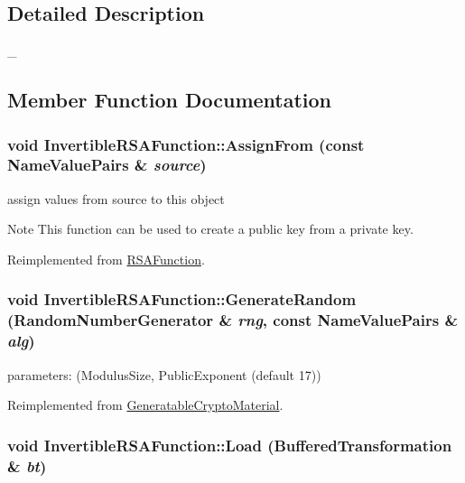 \subsection{Detailed Description}
\_\- 

\subsection{Member Function Documentation}
\hypertarget{class_invertible_r_s_a_function_a871fc366191e9c5fae114c06a200c928}{
\subsubsection[{AssignFrom}]{\setlength{\rightskip}{0pt plus 5cm}void InvertibleRSAFunction::AssignFrom (const {\bf NameValuePairs} \& {\em source})}}
\label{class_invertible_r_s_a_function_a871fc366191e9c5fae114c06a200c928}


assign values from source to this object \begin{DoxyNote}{Note}
This function can be used to create a public key from a private key. 
\end{DoxyNote}


Reimplemented from \hyperlink{class_r_s_a_function_ad2db62b20297a8d9df55171e73fe8de7}{RSAFunction}.\hypertarget{class_invertible_r_s_a_function_a369c37b8f01c8b64f22baa28811ff72f}{
\subsubsection[{GenerateRandom}]{\setlength{\rightskip}{0pt plus 5cm}void InvertibleRSAFunction::GenerateRandom ({\bf RandomNumberGenerator} \& {\em rng}, \/  const {\bf NameValuePairs} \& {\em alg})}}
\label{class_invertible_r_s_a_function_a369c37b8f01c8b64f22baa28811ff72f}
parameters: (ModulusSize, PublicExponent (default 17)) 

Reimplemented from \hyperlink{class_generatable_crypto_material_abe368b52db1ca7079b690f2d6e605f7a}{GeneratableCryptoMaterial}.\hypertarget{class_invertible_r_s_a_function_ad8a540a6369b9043d082b0dc38b99d4b}{
\subsubsection[{Load}]{\setlength{\rightskip}{0pt plus 5cm}void InvertibleRSAFunction::Load ({\bf BufferedTransformation} \& {\em bt})}}
\label{class_invertible_r_s_a_function_ad8a540a6369b9043d082b0dc38b99d4b}


